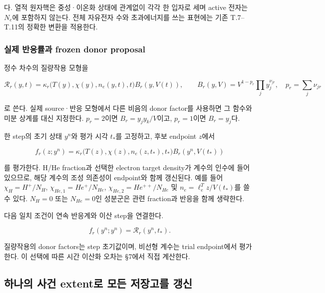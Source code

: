 다. 열적 원자핵은 중성·이온화 상태에 관계없이 각각 한 입자로 세며 active 전자는 \(N_e\)에 포함하지 않는다. 전체 자유전자 수와 초과에너지를 쓰는 표현에는 기존 T.7--T.11의 정확한 변환을 적용한다.

\hypertarget{uxc2e4uxc81c-uxbc18uxc751uxb960uxacfc-frozen-donor-proposal}{%
\subsubsection{실제 반응률과 frozen donor proposal}\label{uxc2e4uxc81c-uxbc18uxc751uxb960uxacfc-frozen-donor-proposal}}

정수 차수의 질량작용 모형을

\[
\mathcal R_r(y,t)=
\kappa_r\bigl(T(y),\chi(y),n_e(y,t),t\bigr)
B_r(y,V(t)),
\qquad
B_r(y,V)=V^{1-p_r}\prod_j y_j^{\nu_{jr}},
\quad p_r=\sum_j\nu_{jr}
\tag{FP.4}
\]

로 쓴다. 실제 source·반응 모형에서 다른 비음의 donor factor를 사용하면 그 함수와 미분 상계를 대신 지정한다. \(p_r=2\)이면 \(B_r=y_jy_k/V\)이고, \(p_r=1\)이면 \(B_r=y_j\)다.

한 step의 초기 상태 \(y^n\)와 평가 시각 \(t_*\)를 고정하고, 후보 endpoint \(z\)에서

\[
f_r(z;y^n)=
\kappa_r\bigl(T(z),\chi(z),n_e(z,t_*),t_*\bigr)
B_r(y^n,V(t_*))
\tag{FP.5}
\]

를 평가한다. H/He fraction과 선택한 electron target density가 계수의 인수에 들어 있으므로, 해당 계수의 조성 의존성이 endpoint와 함께 갱신된다. 예를 들어 \(\chi_H=H^+/N_H\), \(\chi_{He,1}=He^+/N_{He}\), \(\chi_{He,2}=He^{++}/N_{He}\) 및 \(n_e=\ell_e^Tz/V(t_*)\)를 쓸 수 있다. \(N_H=0\) 또는 \(N_{He}=0\)인 성분군은 관련 fraction과 반응을 함께 생략한다.

다음 일치 조건이 연속 반응계와 이산 step을 연결한다.

\[
\boxed{f_r(y^n;y^n)=\mathcal R_r(y^n,t_*).}
\tag{FP.6}
\]

질량작용의 donor factors는 step 초기값이며, 비선형 계수는 trial endpoint에서 평가한다. 이 선택에 따른 시간 이산화 오차는 §7에서 직접 계산한다.

\hypertarget{uxd558uxb098uxc758-uxc0acuxac74-extentuxb85c-uxbaa8uxb4e0-uxc800uxc7a5uxace0uxb97c-uxac31uxc2e0}{%
\subsection{하나의 사건 extent로 모든 저장고를 갱신}\label{uxd558uxb098uxc758-uxc0acuxac74-extentuxb85c-uxbaa8uxb4e0-uxc800uxc7a5uxace0uxb97c-uxac31uxc2e0}}

